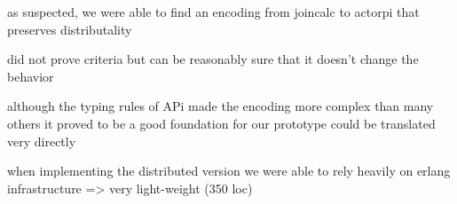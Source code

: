 as suspected, we were able to find an encoding from joincalc to actorpi
that preserves distributality

did not prove criteria
but can be reasonably sure that it doesn't change the behavior

although the typing rules of APi made the encoding more complex
than many others
it proved to be a good foundation for our prototype
could be translated very directly

when implementing the distributed version
we were able to rely heavily on erlang infrastructure
=>
very light-weight (350 loc)

